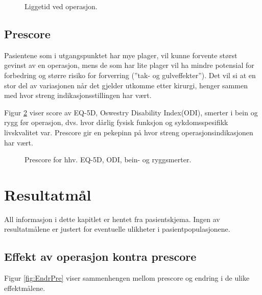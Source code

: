 \documentclass [norsk,a4paper,twoside]{article}\usepackage[]{graphicx}\usepackage[]{color}
\begin{document}
\begin{figure}[h] 
\centerline{
  }
  \caption{Liggetid ved operasjon.}
  \label{fig:Liggedogn}
\end{figure}






\subsection{Prescore}

Pasientene som i utgangspunktet har mye plager, vil kunne forvente størst gevinst av en operasjon, 
mens de som har lite plager vil ha mindre potensial for forbedring og større risiko for 
forverring (”tak- og gulveffekter”). Det vil si at en stor del av variasjonen når det gjelder 
utkomme etter kirurgi, henger sammen med hvor streng indikasjonsstillingen har vært.

Figur \ref{fig:Pre} viser score av EQ-5D, Oswestry Disability Index(ODI), 
smerter i bein og rygg før operasjon, dvs. hvor dårlig fysisk funksjon og sykdomsspesifikk 
livskvalitet var.
Prescore gir en pekepinn på hvor streng operasjonsindikasjonen har vært.






\begin{figure}[h] 
\centerline{
	}
  \centerline{
  }
  \caption{Prescore for hhv. EQ-5D, ODI, bein- og ryggsmerter.}
  \label{fig:Pre}
\end{figure}


\clearpage

\section{Resultatmål}
All informasjon i dette kapitlet er hentet fra pasientskjema. Ingen av resultatmålene er justert
for eventuelle ulikheter i pasientpopulasjonene.


\subsection{Effekt av operasjon kontra prescore}
Figur \ref{fig:EndrPre} viser sammenhengen mellom prescore og endring i de ulike effektmålene.
\end{document}
